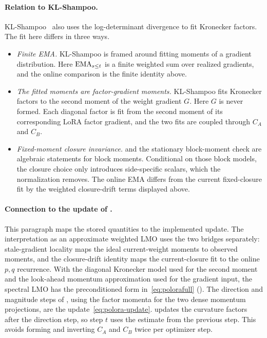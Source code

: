 \paragraph{Relation to KL-Shampoo.}
KL-Shampoo~\cite{klshampoo} also uses the log-determinant divergence to
fit Kronecker factors. The fit here differs in three ways.
\begin{itemize}[leftmargin=1.5em,itemsep=1pt,topsep=2pt]
  \item \emph{Finite EMA.} KL-Shampoo is framed around fitting moments of a
  gradient distribution. Here $\operatorname{EMA}_{s\le t}$ is a finite weighted sum over
  realized gradients, and the online comparison is the finite identity above.
  \item \emph{The fitted moments are factor-gradient moments.} KL-Shampoo
  fits Kronecker factors to the second moment of the weight gradient $G$.
  Here $G$ is never formed. Each diagonal factor is fit from the second
  moment of its corresponding LoRA factor gradient, and the two fits are
  coupled through $C_A$ and $C_B$.
  \item \emph{Fixed-moment closure invariance.}
   and the stationary block-moment check are
  algebraic statements for block moments.
  Conditional on those block models, the closure choice only introduces
  side-specific scalars, which the normalization removes. The online EMA differs
  from the current fixed-closure fit by the weighted closure-drift terms
  displayed above.
\end{itemize}

\paragraph{Connection to the update of .}
This paragraph maps the stored quantities to the implemented update. The
interpretation as an approximate weighted LMO uses the two bridges separately:
stale-gradient locality maps the ideal current-weight moments to observed
moments, and the closure-drift identity maps the current-closure fit to the
online $p,q$ recurrence.
With the diagonal Kronecker model used for the second moment and the
look-ahead momentum approximation used for the gradient input, the spectral LMO
has the preconditioned form in~\eqref{eq:polorafull}
(). The direction and magnitude steps of
, using the factor momenta for the two dense momentum
projections, are the update~\eqref{eq:polora-update}.  updates
the curvature factors after the direction step, so step $t$ uses the estimate
from the previous step. This avoids forming and inverting $C_A$ and $C_B$ twice
per optimizer step.

